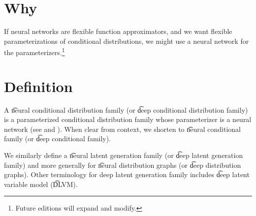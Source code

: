 
\section*{Why}

If neural networks are flexible function approximators, and we want flexible parameterizations of conditional distributions, we might use a neural network for the parameterizers.\footnote{Future editions will expand and modify.}

\section*{Definition}

A \t{neural conditional distribution family} (or \t{deep conditional distribution family}) is a parameterized conditional distribution family whose parameterizer is a neural network (see and ).
When clear from context, we shorten to \t{neural conditional family} (or \t{deep conditional family}).

We similarly define a \t{neural latent generation family} (or \t{deep latent generation family}) and more generally for \t{neural distribution graphs} (or \t{deep distribution graphs}).
Other terminology for deep latent generation family includes \t{deep latent variable model} (\t{DLVM}).

\blankpage